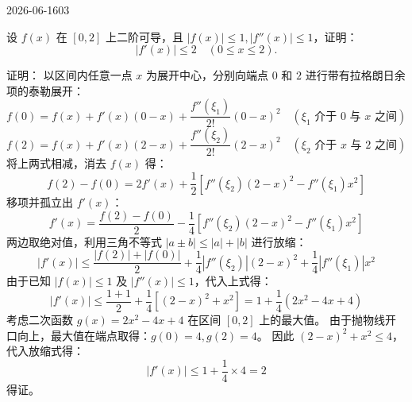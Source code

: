 \begin{mistake}{2026-06-16}{03}

\begin{problemcontent}
设 \(f(x)\) 在 \([0,2]\) 上二阶可导，且 \(|f(x)| \le 1, |f''(x)| \le 1\)，证明：
\[|f'(x)| \le 2 \quad (0 \le x \le 2).\]
\end{problemcontent}

\begin{solutioncontent}
证明：
以区间内任意一点 \(x\) 为展开中心，分别向端点 \(0\) 和 \(2\) 进行带有拉格朗日余项的泰勒展开：
\[f(0) = f(x) + f'(x)(0-x) + \frac{f''(\xi_1)}{2!}(0-x)^2 \quad (\xi_1 \text{ 介于 } 0 \text{ 与 } x \text{ 之间})\]
\[f(2) = f(x) + f'(x)(2-x) + \frac{f''(\xi_2)}{2!}(2-x)^2 \quad (\xi_2 \text{ 介于 } x \text{ 与 } 2 \text{ 之间})\]
将上两式相减，消去 \(f(x)\) 得：
\[f(2) - f(0) = 2f'(x) + \frac{1}{2}\left[ f''(\xi_2)(2-x)^2 - f''(\xi_1)x^2 \right]\]
移项并孤立出 \(f'(x)\)：
\[f'(x) = \frac{f(2) - f(0)}{2} - \frac{1}{4}\left[ f''(\xi_2)(2-x)^2 - f''(\xi_1)x^2 \right]\]
两边取绝对值，利用三角不等式 \(|a \pm b| \le |a| + |b|\) 进行放缩：
\[|f'(x)| \le \frac{|f(2)| + |f(0)|}{2} + \frac{1}{4}|f''(\xi_2)|(2-x)^2 + \frac{1}{4}|f''(\xi_1)|x^2\]
由于已知 \(|f(x)| \le 1\) 及 \(|f''(x)| \le 1\)，代入上式得：
\[|f'(x)| \le \frac{1 + 1}{2} + \frac{1}{4}\left[ (2-x)^2 + x^2 \right] = 1 + \frac{1}{4}(2x^2 - 4x + 4)\]
考虑二次函数 \(g(x) = 2x^2 - 4x + 4\) 在区间 \([0,2]\) 上的最大值。
由于抛物线开口向上，最大值在端点取得：\(g(0) = 4, g(2) = 4\)。
因此 \((2-x)^2 + x^2 \le 4\)，代入放缩式得：
\[|f'(x)| \le 1 + \frac{1}{4} \times 4 = 2\]
得证。
\end{solutioncontent}


\end{mistake}
